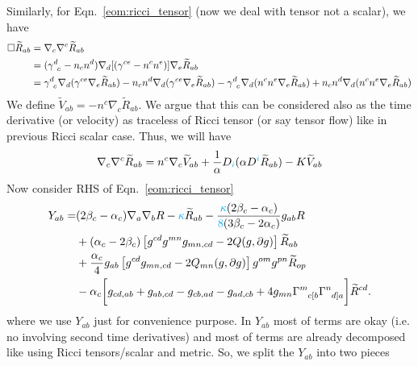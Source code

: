 \documentclass[a4paper,oneside,openany,11pt]{memoir}
\numberwithin{equation}{section} %
\newcommand{\aaron}[1]{{\color{cyan} #1}}
\begin{document}
Similarly, for Eqn.~\ref{eom:ricci_tensor} (now we deal with tensor not a scalar), we have
\begin{align}
\Box \widetilde{R}_{ab} &= \nabla_c \nabla^c \widetilde{R}_{ab} \nonumber \\
&= (\gamma\indices{^d_c} - n_c n^d) \nabla_d [(\gamma\indices{^{ce}} - n^c n^e)] \nabla_e \widetilde{R}_{ab} \nonumber \\
&= \gamma\indices{^d_c} \nabla_d (\gamma^{ce} \nabla_e \widetilde{R}_{ab}) - n_c n^d \nabla_d (\gamma^{ce} \nabla_e \widetilde{R}_{ab})
- \gamma\indices{^d_c} \nabla_d (n^c n^e \nabla_e \widetilde{R}_{ab}) + n_c n^d \nabla_d ( n^c n^e \nabla_e \widetilde{R}_{ab}) \nonumber \\
\end{align}
We define $\widetilde{V}_{ab} = - n^c \nabla_c \widetilde{R}_{ab}$. We argue that this can be considered 
also as the time derivative (or velocity) as traceless of Ricci tensor (or say tensor flow) like in previous
Ricci scalar case. Thus, we will have
\begin{align}
\nabla_c \nabla^c \widetilde{R}_{ab} = n^c \nabla_c \widetilde{V}_{ab} + \frac{1}{\alpha} D_\aaron{i} (\alpha D^\aaron{i} \widetilde{R}_{ab}) - K \widetilde{V}_{ab}
\end{align}
Now consider RHS of Eqn.~\ref{eom:ricci_tensor}
\begin{align}
Y_{ab}= &(2 \beta_c - \alpha_c) \nabla_a \nabla_b R - \aaron{\kappa} \widetilde{R}_{ab} - \frac{\aaron{\kappa}(2 \beta_c - \alpha_c)}{\aaron{8}(3\beta_c - 2 \alpha_c)} g_{ab} R \nonumber \\
&+(\alpha_c - 2 \beta_c)\left[g^{cd}g^{mn} g_{mn,cd} - 2 Q(g,\partial g) \right]\widetilde{R}_{ab} \nonumber \\
&+\frac{\alpha_c}{4} g_{ab} \left[ g^{cd}g_{mn,cd} - 2 Q_{mn} (g,\partial g) \right] g^{om}g^{pn} \widetilde{R}_{op} \nonumber \\
&- \alpha_c \bigg[ g_{cd,ab} + g_{ab,cd} - g_{cb,ad} - g_{ad,cb} +4 g_{mn} \Gamma\indices{^m_{c[b}} \Gamma\indices{^n_{d]a}} \bigg] \widetilde{R}^{cd} .
\end{align}
where we use $Y_{ab}$ just for convenience purpose. In $Y_{ab}$ most of terms are okay (i.e. no involving second \aaron{time} derivatives) 
and most of terms are already decomposed like using Ricci tensors/scalar and metric. So, we split the $Y_{ab}$ into two pieces
\end{document}
